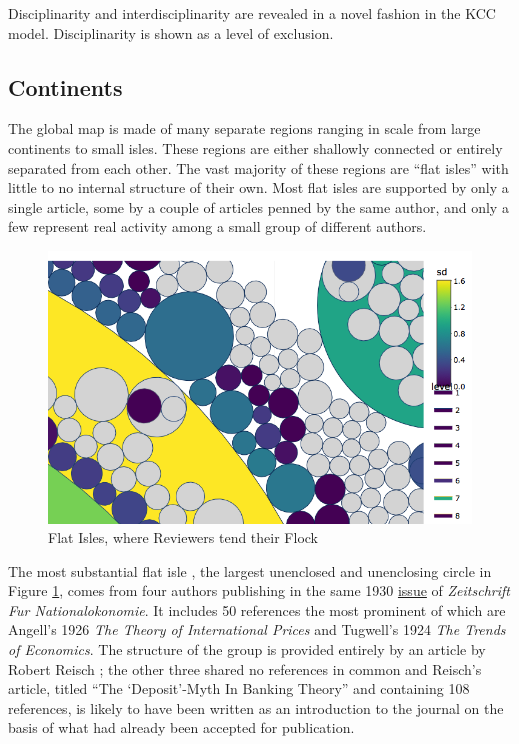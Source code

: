 \documentclass[]{book}
\theoremstyle{definition}
\theoremstyle{definition}
\theoremstyle{definition}
\theoremstyle{remark}
\begin{document}
Disciplinarity and interdisciplinarity are revealed in a novel fashion
in the KCC model. Disciplinarity is shown as a level of exclusion.

\hypertarget{continents}{%
\subsection{Continents}\label{continents}}

The global map is made of many separate regions ranging in scale from
large continents to small isles. These regions are either shallowly
connected or entirely separated from each other. The vast majority of
these regions are ``flat isles'' with little to no internal structure of
their own. Most flat isles are supported by only a single article, some
by a couple of articles penned by the same author, and only a few
represent real activity among a small group of different authors.

\begin{figure}

{\centering \includegraphics[width=0.9\linewidth]{img/flat-isle} 

}

\caption{Flat Isles, where Reviewers tend their Flock}\label{fig:flat-isle}
\end{figure}

The most substantial flat isle , the largest unenclosed and unenclosing
circle in Figure \ref{fig:flat-isle}, comes from four authors publishing
in the same 1930 \href{https://www.jstor.org/stable/i40084238}{issue} of
\emph{Zeitschrift Fur Nationalokonomie}. It includes 50 references the
most prominent of which are Angell's 1926 \emph{The Theory of
International Prices} and Tugwell's 1924 \emph{The Trends of Economics}.
The structure of the group is provided entirely by an article by Robert
Reisch ; the other three shared no references in common and Reisch's
article, titled ``The `Deposit'-Myth In Banking Theory'' and containing
108 references, is likely to have been written as an introduction to the
journal on the basis of what had already been accepted for publication.
\end{document}
